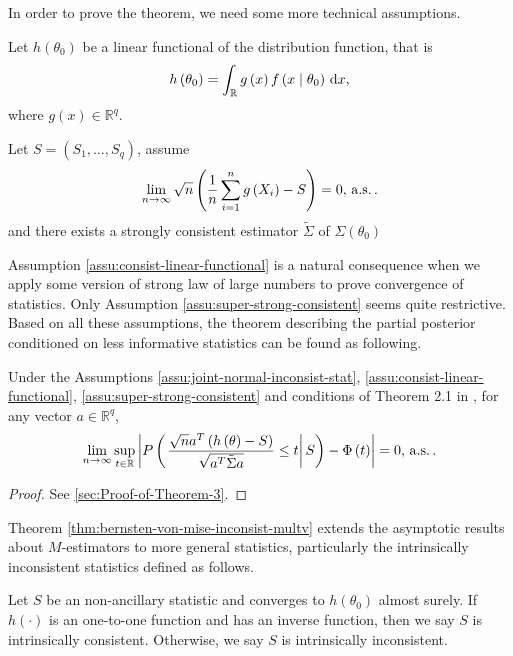 In order to prove the theorem, we need some more technical assumptions.
\begin{assumption}
\label{assu:consist-linear-functional}Let $h\left(\theta_{0}\right)$
be a linear functional of the distribution function, that is 
\[
h\left(\theta_{0}\right)=\int_{\mathbb{R}}g\left(x\right)f\left(x\mid\theta_{0}\right)\,\mathrm{d} x,
\]
where $g\left(x\right)\in\mathbb{R}^{q}$. 
\begin{assumption}
\label{assu:super-strong-consistent}Let $S=\left(S_{1},\ldots,S_{q}\right)$,
assume 
\[
\lim_{n\rightarrow\infty}\sqrt{n}\left(\frac{1}{n}\sum_{i=1}^{n}g\left(X_{i}\right)-S\right)=0,\,\mathrm{a.s.}\,.
\]
and there exists a strongly consistent estimator $\tilde{\Sigma}$
of $\Sigma\left(\theta_{0}\right)$
\end{assumption}
\end{assumption}
Assumption \ref{assu:consist-linear-functional} is a natural consequence
when we apply some version of strong law of large numbers to prove
convergence of statistics. Only Assumption \ref{assu:super-strong-consistent}
seems quite restrictive. Based on all these assumptions, the theorem
describing the partial posterior conditioned on less informative statistics
can be found as following.
\begin{thm}
\label{thm:bernsten-von-mise-inconsist-multv}Under the Assumptions
\ref{assu:joint-normal-inconsist-stat}, \ref{assu:consist-linear-functional},
\ref{assu:super-strong-consistent} and conditions of Theorem 2.1
in \citet{rivoirard2012bernstein}, for any vector $a\in\mathbb{R}^{q}$,
\[
\lim_{n\rightarrow\infty}\sup_{t\in\mathbb{R}}\left|P\left(\left.\frac{\sqrt{n}a^{T}\left(h\left(\theta\right)-S\right)}{\sqrt{a^{T}\tilde{\Sigma}a}}\le t\right|S\right)-\Phi\left(t\right)\right|=0,\,\mathrm{a.s.}\,.
\]
\end{thm}
\begin{proof}
See \ref{sec:Proof-of-Theorem-3}.
\end{proof}
Theorem \ref{thm:bernsten-von-mise-inconsist-multv} extends the asymptotic
results about $M$-estimators to more general statistics, particularly
the intrinsically inconsistent statistics defined as follows.
\begin{defn}
Let $S$ be an non-ancillary statistic and converges to $h\left(\theta_{0}\right)$
almost surely. If $h\left(\cdot\right)$ is an one-to-one function
and has an inverse function, then we say $S$ is intrinsically consistent.
Otherwise, we say $S$ is intrinsically inconsistent. 
\end{defn}
